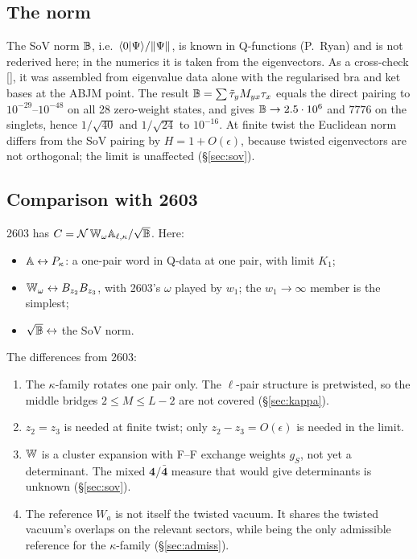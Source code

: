 \subsection{The norm}\label{sec:qform-norm}

The SoV norm $\mathbb B$, i.e.\ $\langle0|\Psi\rangle/\|\Psi\|$, is known in Q-functions (P.~Ryan) and is not rederived here; in the
numerics it is taken from the eigenvectors. As a cross-check [], it was assembled from eigenvalue data
alone with the regularised bra and ket bases at the ABJM point. The result $\mathbb B=\sum\tilde\tau_yM_{yx}\tau_x$ equals the direct
pairing to $10^{-29}$--$10^{-48}$ on all 28 zero-weight states, and gives $\mathbb B\to2.5\cdot10^6$ and $7776$ on the singlets,
hence $1/\sqrt{40}$ and $1/\sqrt{24}$ to $10^{-16}$. At finite twist the Euclidean norm differs from the SoV pairing by
$H=1+O(\epsilon)$, because twisted eigenvectors are not orthogonal; the limit is unaffected (\S\ref{sec:sov}).

\subsection{Comparison with 2603}\label{sec:qform-2603}

2603 has $C=\mathcal N\,\mathbb W_\omega\mathbb A_{\ell,\kappa}/\sqrt{\mathbb B}$. Here:
\begin{itemize}
\item $\mathbb A\leftrightarrow P_\kappa$: a one-pair word in Q-data at one pair, with limit $K_1$;
\item $\mathbb W_\omega\leftrightarrow B_{z_2}B_{z_3}$, with 2603's $\omega$ played by $w_1$; the $w_1\to\infty$ member is the simplest;
\item $\sqrt{\mathbb B}\leftrightarrow$ the SoV norm.
\end{itemize}
The differences from 2603:
\begin{enumerate}
\item The $\kappa$-family rotates one pair only. The $\ell$-pair structure is pretwisted, so the middle bridges
  $2\le M\le L-2$ are not covered (\S\ref{sec:kappa}).
\item $z_2=z_3$ is needed at finite twist; only $z_2-z_3=O(\epsilon)$ is needed in the limit.
\item $\mathbb W$ is a cluster expansion with F--F exchange weights $g_S$, not yet a determinant. The mixed $\mathbf4/\bar{\mathbf4}$
  measure that would give determinants is unknown (\S\ref{sec:sov}).
\item The reference $W_a$ is not itself the twisted vacuum. It shares the twisted vacuum's overlaps on the relevant sectors,
  while being the only admissible reference for the $\kappa$-family (\S\ref{sec:admiss}).
\end{enumerate}

